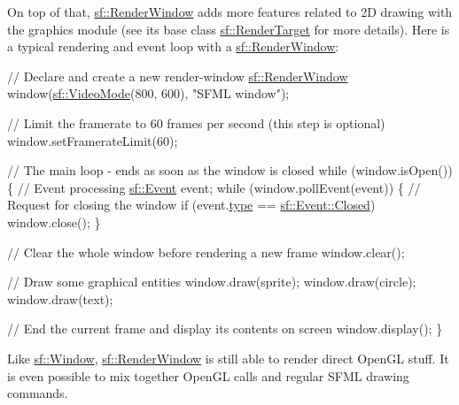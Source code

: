 On top of that, \hyperlink{classsf_1_1_render_window}{sf\-::\-Render\-Window} adds more features related to 2\-D drawing with the graphics module (see its base class \hyperlink{classsf_1_1_render_target}{sf\-::\-Render\-Target} for more details). Here is a typical rendering and event loop with a \hyperlink{classsf_1_1_render_window}{sf\-::\-Render\-Window}\-:


\begin{DoxyCode}
\textcolor{comment}{// Declare and create a new render-window}
\hyperlink{classsf_1_1_render_window}{sf::RenderWindow} window(\hyperlink{classsf_1_1_video_mode}{sf::VideoMode}(800, 600), \textcolor{stringliteral}{"SFML window"});

\textcolor{comment}{// Limit the framerate to 60 frames per second (this step is optional)}
window.setFramerateLimit(60);

\textcolor{comment}{// The main loop - ends as soon as the window is closed}
\textcolor{keywordflow}{while} (window.isOpen())
\{
   \textcolor{comment}{// Event processing}
   \hyperlink{classsf_1_1_event}{sf::Event} event;
   \textcolor{keywordflow}{while} (window.pollEvent(event))
   \{
       \textcolor{comment}{// Request for closing the window}
       \textcolor{keywordflow}{if} (event.\hyperlink{classsf_1_1_event_adf2f8044f713fd9d6019077b0d1ffe0a}{type} == \hyperlink{classsf_1_1_event_af41fa9ed45c02449030699f671331d4aa4f718a7f43b0f2d46be222fe23198d9e}{sf::Event::Closed})
           window.close();
   \}

   \textcolor{comment}{// Clear the whole window before rendering a new frame}
   window.clear();

   \textcolor{comment}{// Draw some graphical entities}
   window.draw(sprite);
   window.draw(circle);
   window.draw(text);

   \textcolor{comment}{// End the current frame and display its contents on screen}
   window.display();
\}
\end{DoxyCode}


Like \hyperlink{classsf_1_1_window}{sf\-::\-Window}, \hyperlink{classsf_1_1_render_window}{sf\-::\-Render\-Window} is still able to render direct Open\-G\-L stuff. It is even possible to mix together Open\-G\-L calls and regular S\-F\-M\-L drawing commands.


